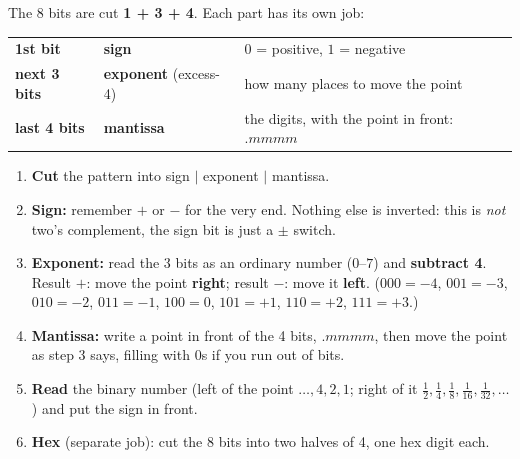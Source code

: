 \documentclass{fkt-notes}
\begin{document}
\newcommand{\floatbits}[8]{%
  \begin{tabular}{|c|ccc|cccc|}
    \hline
    #1 & #2 & #3 & #4 & #5 & #6 & #7 & #8 \\
    \hline
    \multicolumn{1}{c}{\scriptsize sign} & \multicolumn{3}{c}{\scriptsize exponent} & \multicolumn{4}{c}{\scriptsize mantissa}
  \end{tabular}}

\begin{rulebox}[title={Method: decode an 8-bit float (signed) into a fraction and hex}]
  The 8 bits are cut \textbf{1 + 3 + 4}. Each part has its own job:
  \begin{center}
    \begin{tabular}{@{}lll@{}}
      \textbf{1st bit} & \textbf{sign} & $0$ = positive, $1$ = negative \\
      \textbf{next 3 bits} & \textbf{exponent} (excess-4) & how many places to move the point \\
      \textbf{last 4 bits} & \textbf{mantissa} & the digits, with the point in front: $.mmmm$
    \end{tabular}
  \end{center}
  \begin{enumerate}[nosep]
    \item \textbf{Cut} the pattern into sign $|$ exponent $|$ mantissa.
    \item \textbf{Sign:} remember $+$ or $-$ for the very end. Nothing else is inverted:
          this is \emph{not} two's complement, the sign bit is just a $\pm$ switch.
    \item \textbf{Exponent:} read the 3 bits as an ordinary number ($0$--$7$) and
          \textbf{subtract 4}. Result $+$: move the point \textbf{right}; result $-$: move it
          \textbf{left}. ($000{=}{-4}$, $001{=}{-3}$, $010{=}{-2}$, $011{=}{-1}$, $100{=}0$,
          $101{=}{+1}$, $110{=}{+2}$, $111{=}{+3}$.)
    \item \textbf{Mantissa:} write a point in front of the 4 bits, $.mmmm$, then move the point
          as step 3 says, filling with $0$s if you run out of bits.
    \item \textbf{Read} the binary number (left of the point $\dots,4,2,1$; right of it
          $\frac12,\frac14,\frac18,\frac1{16},\frac1{32},\dots$) and put the sign in front.
    \item \textbf{Hex} (separate job): cut the 8 bits into two halves of 4, one hex digit each.
  \end{enumerate}
\end{rulebox}
\end{document}
